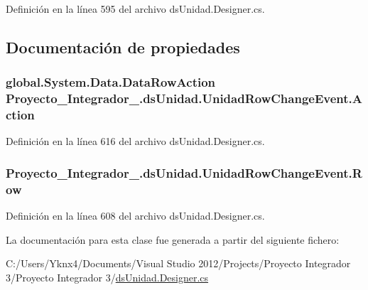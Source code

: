 Definición en la línea 595 del archivo ds\-Unidad.\-Designer.\-cs.



\subsection{Documentación de propiedades}
\hypertarget{class_proyecto___integrador__3_1_1ds_unidad_1_1_unidad_row_change_event_a326a7a9bbe63c16a3ee916456873039e}{
\subsubsection[{Action}]{\setlength{\rightskip}{0pt plus 5cm}global.\-System.\-Data.\-Data\-Row\-Action Proyecto\-\_\-\-Integrador\-\_.\-ds\-Unidad.\-Unidad\-Row\-Change\-Event.\-Action\hspace{0.3cm}{\ttfamily [get]}}}\label{class_proyecto___integrador__3_1_1ds_unidad_1_1_unidad_row_change_event_a326a7a9bbe63c16a3ee916456873039e}


Definición en la línea 616 del archivo ds\-Unidad.\-Designer.\-cs.

\hypertarget{class_proyecto___integrador__3_1_1ds_unidad_1_1_unidad_row_change_event_a0eb95b09cacaa2e7b7d252f9b999294e}{
\subsubsection[{Row}]{ Proyecto\-\_\-\-Integrador\-\_.\-ds\-Unidad.\-Unidad\-Row\-Change\-Event.\-Row\hspace{0.3cm}{\ttfamily [get]}}}\label{class_proyecto___integrador__3_1_1ds_unidad_1_1_unidad_row_change_event_a0eb95b09cacaa2e7b7d252f9b999294e}


Definición en la línea 608 del archivo ds\-Unidad.\-Designer.\-cs.



La documentación para esta clase fue generada a partir del siguiente fichero\-:\begin{DoxyCompactItemize}
\item 
C\-:/\-Users/\-Yknx4/\-Documents/\-Visual Studio 2012/\-Projects/\-Proyecto Integrador 3/\-Proyecto Integrador 3/\hyperlink{ds_unidad_8_designer_8cs}{ds\-Unidad.\-Designer.\-cs}\end{DoxyCompactItemize}
